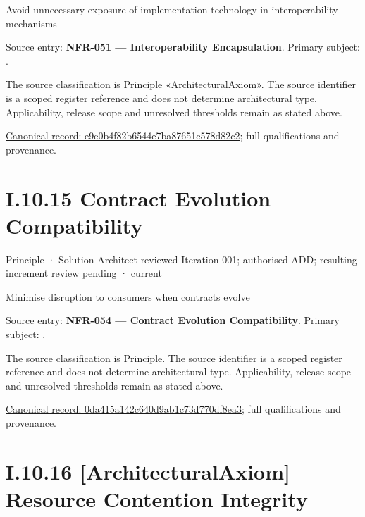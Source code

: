 Avoid unnecessary exposure of implementation technology in interoperability mechanisms



Source entry: \textbf{NFR-051 — Interoperability Encapsulation}. Primary subject: \texttt{}.



The source classification is Principle «ArchitecturalAxiom». The source identifier is a scoped register reference and does not determine architectural type. Applicability, release scope and unresolved thresholds remain as stated above.


{\footnotesize \href{../../../../../../../continuum/motivation/principle/architectural-axiom/e9e0b4f82b6544e7ba87651c578d82c2.md}{Canonical record: e9e0b4f82b6544e7ba87651c578d82c2}; full qualifications and provenance.}\par
\section*{I.10.15 Contract Evolution Compatibility}
\label{navigation:I.10.15}

\label{element:0da415a142c640d9ab1c73d770df8ea3}
{\small Principle · Solution Architect-reviewed Iteration 001; authorised ADD; resulting increment review pending · current}\par

Minimise disruption to consumers when contracts evolve



Source entry: \textbf{NFR-054 — Contract Evolution Compatibility}. Primary subject: \texttt{}.



The source classification is Principle. The source identifier is a scoped register reference and does not determine architectural type. Applicability, release scope and unresolved thresholds remain as stated above.


{\footnotesize \href{../../../../../../../continuum/motivation/principle/0da415a142c640d9ab1c73d770df8ea3.md}{Canonical record: 0da415a142c640d9ab1c73d770df8ea3}; full qualifications and provenance.}\par
\section*{I.10.16 [ArchitecturalAxiom] Resource Contention Integrity}
\label{navigation:I.10.16}

